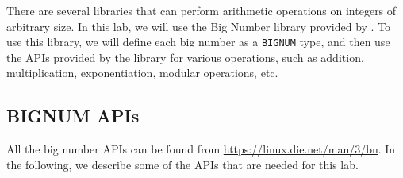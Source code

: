 There are several libraries that can perform arithmetic operations on integers of
arbitrary size. In this lab, we will use the Big Number library provided
by \openssl. To use this library, we will define each big number as
a \texttt{BIGNUM} type, and then use the APIs provided by the library
for various operations, such as addition, multiplication, exponentiation,
modular operations, etc.



\subsection{BIGNUM APIs}

All the big number APIs can be found from
\url{https://linux.die.net/man/3/bn}. In the following,
we describe some of the APIs that are needed for this lab.



